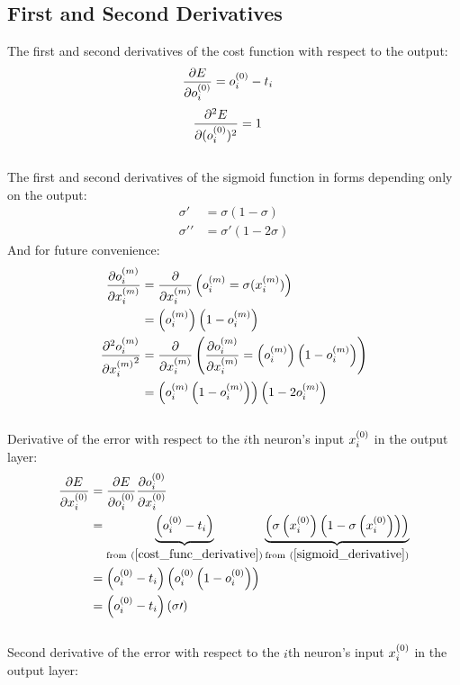 \subsection{First and Second Derivatives} 
The first and second derivatives of the cost function with respect to the output:
\begin{align}
\pdv{E}{o_{i}^{(0)}} &= o_{i}^{(0)} - t_{i} \label{cost_func_derivative}
\end{align}
\begin{align}
\pdv[2]{E}{(o_{i}^{(0)})} &= 1\label{cost_func_2nd_derivative}
\end{align}
\\[5pt]
The first and second derivatives of the sigmoid function in forms depending only on the output:
\begin{align}
\sigma\prime &= \sigma\left(1 - \sigma\right)\label{sigmoid_derivative} 
\\
\sigma\prime\prime &= \sigma\prime\left(1 - 2\sigma\right) \label{sigmoid_2nd_derivative}
\end{align}
And for future convenience: 
\begin{align}
\pdv{o_{i}^{(m)}}{x_{i}^{(m)}} &= 
\pdv{}{x_{i}^{(m)}}\left({o_{i}^{(m)}} = \sigma(x_{i}^{(m)})\right) \\
&= \left(o_{i}^{(m)}\right)\left(1 - o_{i}^{(m)}\right)
\\
\pdv[2]{{o_{i}^{(m)}}}{{x_{i}^{(m)}}} &=
\pdv{}{{x_{i}^{(m)}}}\left(\pdv{o_{i}^{(m)}}{x_{i}^{(m)}} = \left(o_{i}^{(m)}\right)\left(1 - o_{i}^{(m)}\right)\right)
\\
&= \left(o_{i}^{(m)}\left(1 - o_{i}^{(m)}\right)\right)\left(1 - 2o_{i}^{(m)}\right)
\end{align}
\\[5pt]Derivative of the error with respect to the $i$th neuron's input $x_{i}^{(0)}$ in the output layer:
\begin{align}
\pdv{E}{\Input i 0} &= \pdv{E}{\Out i 0} \pdv{\Out i 0}{\Input i 0} 
\\
&= \underbrace{\left(\Out i 0 - \Target i\right)}_{\text{from} \ (\ref{cost_func_derivative})} \underbrace{\left(\sigma\left(\Input i 0\right)\left(1 - \sigma\left(\Input i 0\right)\right)\right)}_{\text{from} \ (\ref{sigmoid_derivative})}
\\
&= \left(\Out i 0 - \Target i\right)\left(\Out i 0 \left(1 - \Out i 0\right)\right)
\\
&= \left(\Out i 0 - \Target i\right)\left(\sigma\prime\right)
\end{align}
\\[5pt]Second derivative of the error with respect to the $i$th neuron's input $x_{i}^{(0)}$ in the output layer:
